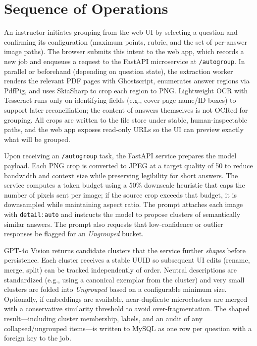 \documentclass[ms,twoside,print]{nuthesis}
\begin{document}
\section{Sequence of Operations}
An instructor initiates grouping from the web UI by selecting a question and confirming its configuration (maximum points, rubric, and the set of per-answer image paths). The browser submits this intent to the web app, which records a new job and enqueues a request to the FastAPI microservice at \texttt{/autogroup}. In parallel or beforehand (depending on question state), the extraction worker renders the relevant PDF pages with Ghostscript, enumerates answer regions via PdfPig, and uses SkiaSharp to crop each region to PNG. Lightweight OCR with Tesseract runs only on identifying fields (e.g., cover-page name/ID boxes) to support later reconciliation; the content of answers themselves is not OCRed for grouping. All crops are written to the file store under stable, human-inspectable paths, and the web app exposes read-only URLs so the UI can preview exactly what will be grouped.

Upon receiving an \texttt{/autogroup} task, the FastAPI service prepares the model payload. Each PNG crop is converted to JPEG at a target quality of 50 to reduce bandwidth and context size while preserving legibility for short answers. The service computes a token budget using a 50\% downscale heuristic that caps the number of pixels sent per image; if the source crop exceeds that budget, it is downsampled while maintaining aspect ratio. The prompt attaches each image with \texttt{detail:auto} and instructs the model to propose clusters of semantically similar answers. The prompt also requests that low-confidence or outlier responses be flagged for an \emph{Ungrouped} bucket.

GPT-4o Vision returns candidate clusters that the service further \emph{shapes} before persistence. Each cluster receives a stable UUID so subsequent UI edits (rename, merge, split) can be tracked independently of order. Neutral descriptions are standardized (e.g., using a canonical exemplar from the cluster) and very small clusters are folded into \emph{Ungrouped} based on a configurable minimum size. Optionally, if embeddings are available, near-duplicate microclusters are merged with a conservative similarity threshold to avoid over-fragmentation. The shaped result---including cluster membership, labels, and an audit of any collapsed/ungrouped items---is written to MySQL as one row per question with a foreign key to the job.
\end{document}
